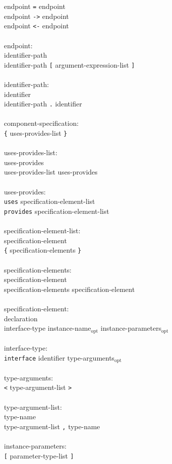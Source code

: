 \documentclass[11pt,letterpaper]{article}
\newcommand{\kw}[1]{{\tt #1}}
\newcommand{\opt}{$_{\mbox{opt}}$\xspace}
\begin{document}
\begin{tabbing}
\>	endpoint \kw{=} endpoint\\
\>	endpoint \kw{->} endpoint\\
\>	endpoint \kw{<-} endpoint\\
\\
endpoint:\\
\>	identifier-path \\
\>	identifier-path \kw{[} argument-expression-list \kw{]}\\
\\
identifier-path:\\
\>	identifier\\
\>	identifier-path \kw{.} identifier\\
\\
component-specification:\\
\>	\kw{\{} uses-provides-list \kw{\}}\\
\\
uses-provides-list:\\
\>	uses-provides\\
\>	uses-provides-list uses-provides\\
\\
uses-provides:\\
\>	\kw{uses} specification-element-list\\
\>	\kw{provides} specification-element-list\\
\\
specification-element-list:\\
\>	specification-element\\
\>	\kw{\{} specification-elements \kw{\}}\\
\\
specification-elements:\\
\>	specification-element\\
\>	specification-elements specification-element\\
\\
specification-element:\\
\>	declaration\\
\>	interface-type instance-name\opt instance-parameters\opt\\
\\
interface-type:\\
\>	\kw{interface} identifier type-arguments\opt\\
\\
type-arguments:\\
\>	\kw{<} type-argument-list \kw{>}\\
\\
type-argument-list:\\
\>	type-name\\
\>	type-argument-list \kw{,} type-name\\
\\
instance-parameters:\\
\>	\kw{[} parameter-type-list \kw{]}
\end{tabbing} \rm
\end{document}
